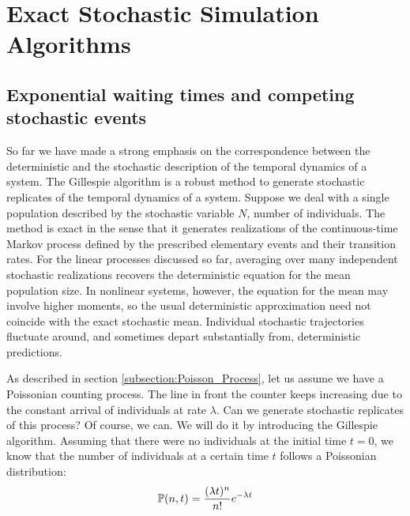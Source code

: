 \section{Exact Stochastic Simulation Algorithms}

\subsection{Exponential waiting times and competing stochastic events}
So far we have made a strong emphasis on the correspondence between the deterministic and the stochastic description of the temporal dynamics of a system. The Gillespie algorithm is a robust method to generate stochastic replicates of the temporal dynamics of a system. Suppose we deal with a single population described by the stochastic variable $N$, number of individuals. The method is exact in the sense that it generates realizations of the continuous-time Markov process defined by the prescribed elementary events and their transition rates. For the linear processes discussed so far, averaging over many independent stochastic realizations recovers the deterministic equation for the mean population size. In nonlinear systems, however, the equation for the mean may involve higher moments, so the usual deterministic approximation need not coincide with the exact stochastic mean. Individual stochastic trajectories fluctuate around, and sometimes depart substantially from, deterministic predictions.  
\smallskip

As described in section \ref{subsection:Poisson_Process}, let us assume we have a Poissonian counting process. The line in front the counter keeps increasing due to the constant arrival of individuals at rate $\lambda$. Can we generate stochastic replicates of this process? Of course, we can. We will do it by introducing the Gillespie algorithm. Assuming that there were no individuals at the initial time $t=0$, we know that the number of individuals at a certain time $t$ follows a Poissonian distribution:
\begin{equation}
{\mathbb P}(n, t) =  \frac{(\lambda t)^n}{n!} e^{-\lambda t}
\label{Poisson_Distribution}
\end{equation}

